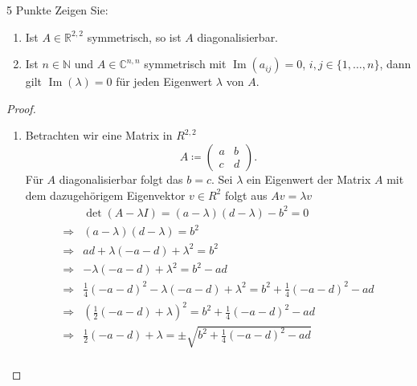 \documentclass{problemset}
\begin{document}
\begin{problem}{5 Punkte}
Zeigen Sie:
\begin{enumerate}
    \item Ist $A \in \mathbb{R}^{2,2}$ symmetrisch, so ist $A$
          diagonalisierbar.
    \item Ist $n \in \mathbb{N}$ und $A \in \mathbb{C}^{n,n}$ symmetrisch mit
          $\operatorname{Im}(a_{ij}) = 0$, $i, j \in \{1, \dots, n\}$, dann
          gilt $\operatorname{Im}(\lambda) = 0$ für jeden Eigenwert $\lambda$
          von $A$.
\end{enumerate}
\begin{proof}
    \leavevmode
    \begin{enumerate}
        \item
              Betrachten wir eine Matrix in \(R^{2,2}\)
              \begin{equation*}
                  A \coloneq \begin{pmatrix}
                      a & b \\
                      c & d
                  \end{pmatrix}.
              \end{equation*}
              Für \(A\) diagonalisierbar folgt das \(b = c\).
              Sei \(\lambda\) ein Eigenwert der Matrix \(A\) mit dem
              dazugehörigem Eigenvektor \(v \in R^2\) folgt aus \(Av = \lambda v\)
              \begin{align*}
                              & \det(A - \lambda I) = (a - \lambda)(d - \lambda) - b^2 = 0                                  \\
                  \Rightarrow & (a - \lambda)(d - \lambda) = b^2                                                            \\
                  \Rightarrow & ad + \lambda(- a - d) + \lambda^2 = b^2                                                     \\
                  \Rightarrow & - \lambda(- a - d) + \lambda^2 = b^2 - ad                                                   \\
                  \Rightarrow & \frac{1}{4}{(-a - d)}^2 - \lambda(- a - d) + \lambda^2 = b^2 + \frac{1}{4}{(-a - d)}^2 - ad \\
                  \Rightarrow & {\left(\frac{1}{2}(-a - d) + \lambda\right)}^2  = b^2 + \frac{1}{4}{(-a - d)}^2 - ad        \\
                  \Rightarrow & \frac{1}{2}(-a - d) + \lambda  = \pm \sqrt{b^2 + \frac{1}{4}{(-a - d)}^2 - ad}              \\

\end{align*}
\end{enumerate}
\end{proof}
\end{problem}
\end{document}
